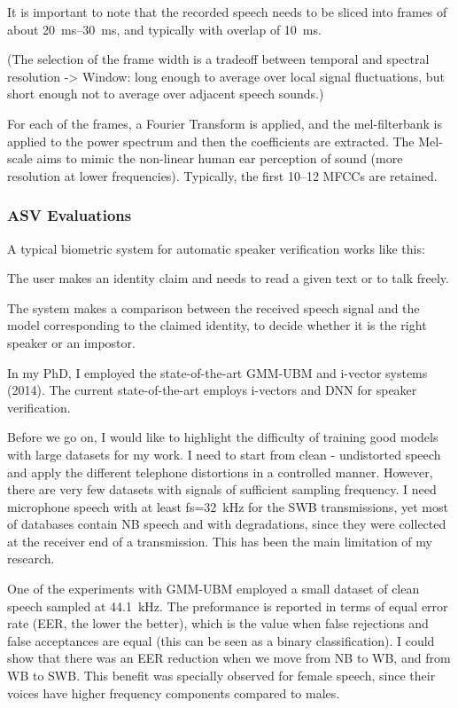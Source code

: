 \documentclass[a4paper]{article}
\begin{document}
It is important to note that the recorded speech needs to be sliced into frames of about 20~ms--30~ms, and typically with overlap of 10~ms. 

(The selection of the frame width is a tradeoff between temporal and spectral resolution -> Window: long enough to average over local signal fluctuations, but short enough not to average over adjacent speech sounds.)

For each of the frames, a Fourier Transform is applied, and the mel-filterbank is applied to the power spectrum and then the coefficients are extracted. The Mel-scale aims to mimic the non-linear human ear perception of sound (more resolution at lower frequencies). Typically, the first 10--12 MFCCs are retained.

\subsubsection{ASV Evaluations}

A typical biometric system for automatic speaker verification works like this:

The user makes an identity claim and needs to read a given text or to talk freely.

The system makes a comparison between the received speech signal and the model corresponding to the claimed identity, to decide whether it is the right speaker or an impostor.

In my PhD, I employed the state-of-the-art GMM-UBM and i-vector systems (2014). The current state-of-the-art employs i-vectors and DNN for speaker verification.

Before we go on, I would like to highlight the difficulty of training good models with large datasets for my work. I need to start from clean - undistorted speech and apply the different telephone distortions in a controlled manner. However, there are very few datasets with signals of sufficient sampling frequency. I need microphone speech with at least fs=32~kHz for the SWB transmissions, yet most of databases contain NB speech and with degradations, since they were collected at the receiver end of a transmission. This has been the main limitation of my research.

One of the experiments with GMM-UBM employed a small dataset of clean speech sampled at 44.1~kHz. The preformance is reported in terms of equal error rate (EER, the lower the better), which is the value when false rejections and false acceptances are equal (this can be seen as a binary classification). I could show that there was an EER reduction when we move from NB to WB, and from WB to SWB. This benefit was specially observed for female speech, since their voices have higher frequency components compared to males.
\end{document}
